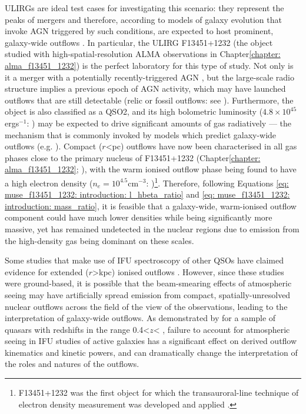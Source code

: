 ULIRGs are ideal test cases for investigating this scenario: they represent the peaks of mergers and therefore, according to models of galaxy evolution that invoke AGN triggered by such conditions, are expected to host prominent, galaxy-wide outflows \citep{Springel2005, DiMatteo2005, Hopkins2008, Johansson2009}. In particular, the ULIRG F13451+1232 (the object studied with high-spatial-resolution ALMA observations in Chapter\;\ref{chapter: alma_f13451_1232}) is the perfect laboratory for this type of study. Not only is it a merger \citep{Gilmore1986, Heckman1986, Tadhunter2018} with a potentially recently-triggered AGN \citep{Stanghellini2005}, but the large-scale radio structure implies a previous epoch of AGN activity, which may have launched outflows that are still detectable (relic or fossil outflows: see \citealt{King2010, Fluetsch2019, Zubovas2023}). Furthermore, the object is also classified as a QSO2, and its high bolometric luminosity ($4.8\times10^{45}$\;erg\;s$^{-1}$: \citealt{Rose2018}) may be expected to drive significant amounts of gas radiatively --- the mechanism that is commonly invoked by models which predict galaxy-wide outflows (e.g. \citealt{DiMatteo2005, Curtis2016, Barai2018, Zubovas2023}). Compact ($r$\;\textless{}\;pc) outflows have now been characterised in all gas phases close to the primary nucleus of F13451+1232 (Chapter\;\ref{chapter: alma_f13451_1232}; \citealt{Holt2003, Morganti2005, Rupke2005, Holt2011, Morganti2013_4c1250, Rose2018, Tadhunter2018, VillarMartin2023}), with the warm ionised outflow phase being found to have a high electron density ($n_e=10^{4.5}$\;cm$^{-3}$: \citealt{Holt2003, Holt2011, Rose2018})\footnote{F13451+1232 was the first object for which the transauroral-line technique of electron density measurement was developed and applied \citep{Holt2011}.}. Therefore, following Equations \ref{eq: muse_f13451_1232: introduction: l_hbeta_ratio} and \ref{eq: muse_f13451_1232: introduction: mass_ratio}, it is feasible that a galaxy-wide, warm-ionised outflow component could have much lower densities while being significantly more massive, yet has remained undetected in the nuclear regions due to emission from the high-density gas being dominant on these scales.

Some studies that make use of IFU spectroscopy of other QSOs have claimed evidence for extended ($r$\;\textgreater{}\;kpc) ionised outflows \citep{Fu2009, Westmoquette2012, Liu2013, Liu2014, Harrison2014, McElroy2015, Wylezalek2017}. However, since these studies were ground-based, it is possible that the beam-smearing effects of atmospheric seeing may have artificially spread emission from compact, spatially-unresolved nuclear outflows across the field of the view of the observations, leading to the interpretation of galaxy-wide outflows. As demonstrated by \citet{Husemann2016} for a sample of quasars with redshifts in the range 0.4\;\textless\;$z$\;\textless{} \citep{Liu2014}, failure to account for atmospheric seeing in IFU studies of active galaxies has a significant effect on derived outflow kinematics and kinetic powers, and can dramatically change the interpretation of the roles and natures of the outflows.

